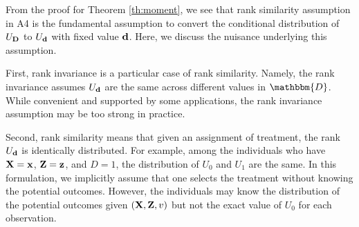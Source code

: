 From the proof for Theorem \ref{th:moment}, we see that rank similarity
assumption in A4 is the fundamental assumption to convert the conditional
distribution of $U_{\mathbf{D}}$ to $U_{\mathbf{d}}$ with fixed value $\mathbf{d}$. Here, we discuss the
nuisance underlying this assumption.

First, rank invariance is a particular case of rank similarity. Namely, the
rank invariance assumes $U_{\mathbf{d}}$ are the same across different values in
$\mathbbm{D}$. While convenient and supported by some applications, the rank
invariance assumption may be too strong in practice.

Second, rank similarity means that given an assignment of treatment, the rank
$U_{\mathbf{d}}$ is identically distributed. For example, among the individuals who have
$\mathbf{X}=\mathbf{x}$, $\mathbf{Z}=\mathbf{z}$, and $D=1$, the distribution of $U_0$ and $U_1$ are the
same. In this formulation, we implicitly assume that one selects the treatment
without knowing the potential outcomes. However, the individuals may know the
distribution of the potential outcomes given $(\mathbf{X}, \mathbf{Z}, v)$ but not the exact
value of $U_0$ for each observation.
